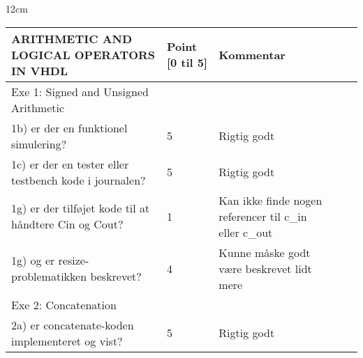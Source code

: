 \documentclass[../journal.tex]{subfiles}
\begin{document}
\begin{table}[p]
   \scriptsize{12cm}
   \begin{tabular}{lllll}
   \hline
   \multicolumn{1}{|l|}{ARITHMETIC AND LOGICAL OPERATORS IN VHDL}                                                                            & \multicolumn{1}{l|}{Point {[}0 til 5{]}} & \multicolumn{1}{l|}{Kommentar}                         & \multicolumn{1}{l|}{} & \multicolumn{1}{l|}{} \\ \hline
   \multicolumn{1}{|l|}{Exe 1: Signed and Unsigned Arithmetic}                                                                               & \multicolumn{1}{l|}{}                    & \multicolumn{1}{l|}{}                                  & \multicolumn{1}{l|}{} & \multicolumn{1}{l|}{} \\ \hline
   \multicolumn{1}{|l|}{1b) er der en funktionel simulering?}                                                                                & \multicolumn{1}{l|}{5}                   & \multicolumn{1}{l|}{Rigtig godt}                       & \multicolumn{1}{l|}{} & \multicolumn{1}{l|}{} \\ \hline
   \multicolumn{1}{|l|}{1c) er der en tester eller testbench kode i journalen?}                                                              & \multicolumn{1}{l|}{5}                   & \multicolumn{1}{l|}{Rigtig godt}                       & \multicolumn{1}{l|}{} & \multicolumn{1}{l|}{} \\ \hline
   1g) er der tilføjet kode til at håndtere Cin og Cout?                                                                                     & 1                                        & Kan ikke finde nogen referencer til c\_in eller c\_out &                       &                       \\
   1g) og er resize-problematikken beskrevet?                                                                                                & 4                                        & Kunne måske godt være beskrevet lidt mere              &                       &                       \\
   Exe 2: Concatenation                                                                                                                      &                                          &                                                        &                       &                       \\
   2a) er concatenate-koden implementeret og vist?                                                                                           & 5                                        & Rigtig godt                                            &                       &                       \\

\end{tabular}
\end{table}
\end{document}
